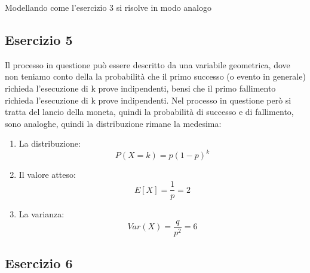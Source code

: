 \documentclass[12pt]{article}
\begin{document}
Modellando come l'esercizio 3 si risolve in modo analogo

\subsection*{Esercizio 5}
Il processo in questione può essere descritto da una variabile geometrica, dove non teniamo conto della la probabilità 
che il primo successo (o evento in generale) richieda l'esecuzione di k prove indipendenti, bensi che il primo fallimento richieda l'esecuzione
di k prove indipendenti. Nel processo in questione però si tratta del lancio della moneta, quindi la probabilità di successo e di fallimento,
sono analoghe, quindi la distribuzione rimane la medesima:
\begin{enumerate}
    \item La distribuzione:
    \[
    P(X = k) = p(1-p)^k    
    \]
    \item Il valore atteso:
    \[
    E[X] = \frac{1}{p} = 2    
    \]
    \item La varianza:
    \[
    Var(X) = \frac{q}{p^2} = 6     
    \]
\end{enumerate}

\subsection*{Esercizio 6}
\end{document}
